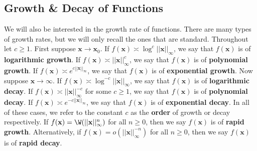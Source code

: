     \subsection*{Growth \& Decay of Functions}
      We will also be interested in the growth rate of functions. There are many types of growth rates, but we will only recall the ones that are standard. Throughout let $c \ge 1$. First suppose $\mathbf{x} \to \mathbf{x}_{0}$. If $f(\mathbf{x}) \asymp \log^{c}||\mathbf{x}||_{\infty}$, we say that $f(\mathbf{x})$ is of \textbf{logarithmic growth}. If $f(\mathbf{x}) \asymp ||\mathbf{x}||_{\infty}^{c}$, we say that $f(\mathbf{x})$ is of \textbf{polynomial growth}. If $f(\mathbf{x}) \asymp e^{c||\mathbf{x}||_{\infty}}$, we say that $f(\mathbf{x})$ is of \textbf{exponential growth}. Now suppose $\mathbf{x} \to \infty$. If $f(\mathbf{x}) \asymp \log^{-c}||\mathbf{x}||_{\infty}$, we say that $f(\mathbf{x})$ is of \textbf{logarithmic decay}. If $f(\mathbf{x}) \asymp ||\mathbf{x}||_{\infty}^{-c}$ for some $c \ge 1$, we say that $f(\mathbf{x})$ is of \textbf{polynomial decay}. If $f(\mathbf{x}) \asymp e^{-c||\mathbf{x}||_{\infty}}$, we say that $f(\mathbf{x})$ is of \textbf{exponential decay}. In all of these cases, we refer to the constant $c$ as the \textbf{order} of growth or decay respectively. If $f(\mathbf{x}) = \W(||\mathbf{x}||_{\infty}^{n})$ for all $n \ge 0$, then we say $f(\mathbf{x})$ is of \textbf{rapid growth}. Alternatively, if $f(\mathbf{x}) = o(||\mathbf{x}||_{\infty}^{-n})$ for all $n \ge 0$, then we say $f(\mathbf{x})$ is of \textbf{rapid decay}.
